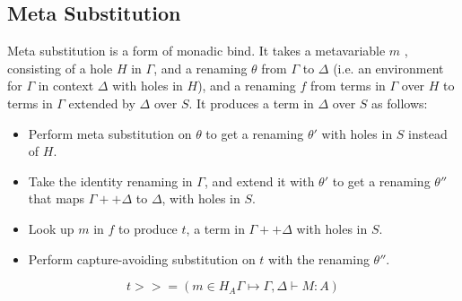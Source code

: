 \subsection{Meta Substitution}
Meta substitution is a form of monadic bind.
It takes a metavariable $m$ , consisting of a hole $H$ in $\Gamma$, and a renaming $\theta$ from $\Gamma$ to $\Delta$ (i.e. an environment for $\Gamma$ in context $\Delta$ with holes in $H$), and a renaming $f$ from terms in $\Gamma$ over $H$ to terms in $\Gamma$ extended by $\Delta$ over $S$. It produces a term in $\Delta$ over $S$ as follows:
\begin{itemize}
\item Perform meta substitution on $\theta$ to get a renaming $\theta'$ with holes in $S$ instead of $H$.
\item Take the identity renaming in $\Gamma$, and extend it with $\theta'$ to get a renaming $\theta''$ that maps $\Gamma ++ \Delta$ to $\Delta$, with holes in $S$.
\item Look up $m$ in $f$ to produce $t$, a term in $\Gamma ++ \Delta$ with holes in $S$.
\item Perform capture-avoiding substitution on $t$ with the renaming $\theta''$.
\end{itemize}

\[
  t >>= (m \in H_A\Gamma \mapsto \Gamma, \Delta \vdash M : A)
\]
